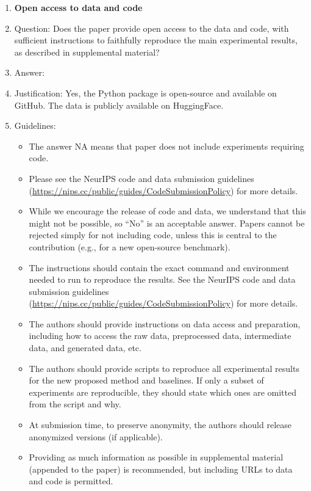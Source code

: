 \documentclass{article}
\begin{document}
\begin{enumerate}
\item {\bf Open access to data and code}
    \item[] Question: Does the paper provide open access to the data and code, with sufficient instructions to faithfully reproduce the main experimental results, as described in supplemental material?
    \item[] Answer: \answerYes{} %
    \item[] Justification: Yes, the Python package is open-source and available on GitHub. The data is publicly available on HuggingFace.
    \item[] Guidelines:
    \begin{itemize}
        \item The answer NA means that paper does not include experiments requiring code.
        \item Please see the NeurIPS code and data submission guidelines (\url{https://nips.cc/public/guides/CodeSubmissionPolicy}) for more details.
        \item While we encourage the release of code and data, we understand that this might not be possible, so “No” is an acceptable answer. Papers cannot be rejected simply for not including code, unless this is central to the contribution (e.g., for a new open-source benchmark).
        \item The instructions should contain the exact command and environment needed to run to reproduce the results. See the NeurIPS code and data submission guidelines (\url{https://nips.cc/public/guides/CodeSubmissionPolicy}) for more details.
        \item The authors should provide instructions on data access and preparation, including how to access the raw data, preprocessed data, intermediate data, and generated data, etc.
        \item The authors should provide scripts to reproduce all experimental results for the new proposed method and baselines. If only a subset of experiments are reproducible, they should state which ones are omitted from the script and why.
        \item At submission time, to preserve anonymity, the authors should release anonymized versions (if applicable).
        \item Providing as much information as possible in supplemental material (appended to the paper) is recommended, but including URLs to data and code is permitted.
    \end{itemize}



\end{enumerate}
\end{document}

